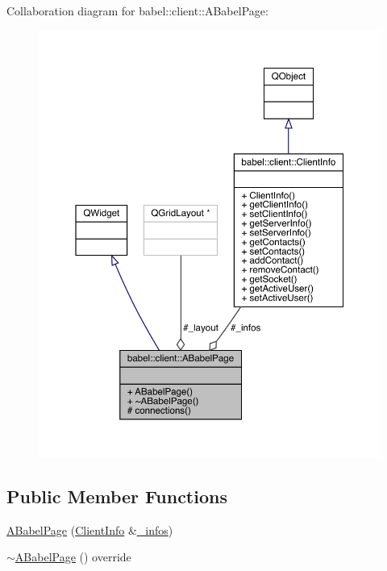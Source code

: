 Collaboration diagram for babel\+:\+:client\+:\+:A\+Babel\+Page\+:\nopagebreak
\begin{figure}[H]
\begin{center}
\leavevmode
\includegraphics[width=350pt]{classbabel_1_1client_1_1_a_babel_page__coll__graph}
\end{center}
\end{figure}
\subsection*{Public Member Functions}
\begin{DoxyCompactItemize}
\item 
\mbox{\hyperlink{classbabel_1_1client_1_1_a_babel_page_ac21e8b8f232917da3385ba41fc3ee493}{A\+Babel\+Page}} (\mbox{\hyperlink{classbabel_1_1client_1_1_client_info}{Client\+Info}} \&\mbox{\hyperlink{classbabel_1_1client_1_1_a_babel_page_aa2070ebfda878ceff938b8a60e7e2898}{\+\_\+infos}})
\item 
\mbox{\hyperlink{classbabel_1_1client_1_1_a_babel_page_a8e7736f1bae579f73ac41bdc3e23f2a4}{$\sim$\+A\+Babel\+Page}} () override
\end{DoxyCompactItemize}
